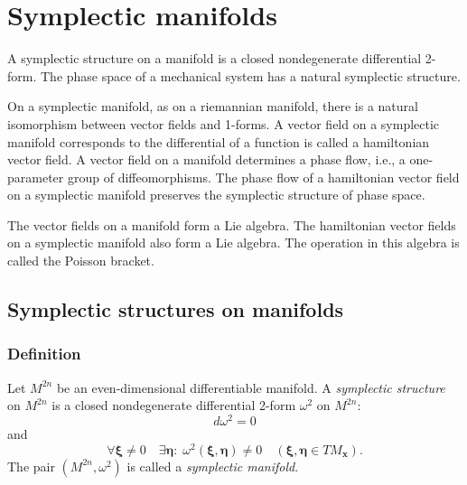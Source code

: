 \documentclass{book}
\numberwithin{equation}{section}
\theoremstyle{plain}
\theoremstyle{definition}
\newtheorem*{defn*}{Definition}
\theoremstyle{remark}
\theoremstyle{smallcap}
\numberwithin{prob}{section}
\begin{document}
\chapter{Symplectic manifolds}


A symplectic structure on a manifold is a closed nondegenerate differential
2-form.  The phase space of a mechanical system has a natural symplectic
structure.

On a symplectic manifold, as on a riemannian manifold, there is a natural
isomorphism between vector fields and 1-forms.  A vector field on a symplectic
manifold corresponds to the differential of a function is called a
hamiltonian vector field.  A vector field on a manifold determines a phase
flow, i.e., a one-parameter group of diffeomorphisms.  The phase flow of a
hamiltonian vector field on a symplectic manifold preserves the symplectic
structure of phase space.

The vector fields on a manifold form a Lie algebra.  The hamiltonian
vector fields on a symplectic manifold also form a Lie algebra. The operation
in this algebra is called the Poisson bracket.

\section{Symplectic structures on manifolds}

\subsection{Definition}



Let $M^{2n}$ be an even-dimensional differentiable manifold.
A \emph{symplectic structure} on $M^{2n}$ is a closed nondegenerate differential 2-form
$\omega^2$ on $M^{2n}$:
$$
d\omega^2 = 0
$$
and
$$
\forall \pmb \xi \ne 0
\quad
\exists \pmb \eta:
\;
\omega^2(\pmb \xi, \pmb \eta) \ne 0
\quad
(\pmb \xi, \pmb \eta \in TM_{\mathbf x}).
$$
The pair $(M^{2n}, \omega^2)$ is called
a \emph{symplectic manifold}.

\end{document}
